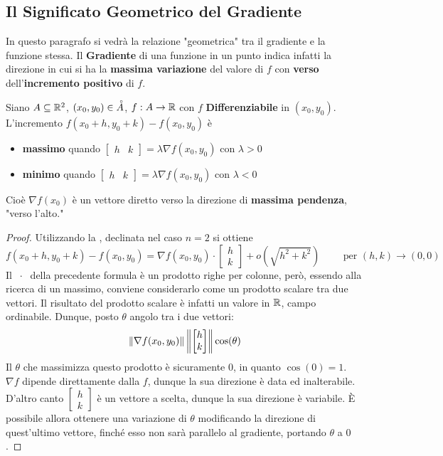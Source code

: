 \subsection{Il Significato Geometrico del Gradiente}
In questo paragrafo si vedrà la relazione "geometrica" tra il gradiente e la funzione stessa. Il \textbf{Gradiente} di una funzione in un punto indica infatti la direzione in cui si ha la \textbf{massima variazione} del valore di $f$ con \textbf{verso} dell'\textbf{incremento positivo} di $f$.
\begin{proposition}
	Siano $A \subseteq \mathbb{R}^2$, $(x_0, y_0) \in \accentset{\circ}{A}$, $f: A \to \mathbb{R}$ con $f$ \textbf{Differenziabile} in $(x_0, y_0)$.\\
	L'incremento $f(x_0 + h, y_0 + k) - f(x_0, y_0)$ è
	\begin{itemize}[noitemsep]
		\item \textbf{massimo} quando $\begin{bmatrix}h & k\end{bmatrix} = \lambda \nabla f(x_0, y_0)$ con $\lambda > 0$
		\item \textbf{minimo} quando $\begin{bmatrix}h & k\end{bmatrix} = \lambda \nabla f(x_0, y_0)$ con $\lambda < 0$
	\end{itemize}
	Cioè $\nabla f(x_0)$ è un vettore diretto verso la direzione di \textbf{massima pendenza}, "verso l'alto."
	\begin{proof}
		Utilizzando la , declinata nel caso $n = 2$ si ottiene
		\begin{equation}
			\label{eq:dim_dir_grad}
			f(x_0 + h, y_0 + k) -
			f(x_0, y_0) =
			\nabla f(x_0, y_0) \cdot
			\begin{bmatrix}
				h\\k
			\end{bmatrix} +
			o(\sqrt{h^2 + k^2})
			\qquad \text{ per } (h,k) \to (0,0)
		\end{equation}
		Il $\;\cdot\;$ della precedente formula è un prodotto righe per colonne, però, essendo alla ricerca di un massimo, conviene considerarlo come un prodotto scalare tra due vettori. Il risultato del prodotto scalare è infatti un valore in $\mathbb{R}$, campo ordinabile. Dunque, posto $\theta$ angolo tra i due vettori:
		\[\left\|\nabla f(x_0, y_0)\right\| \left\|\begin{bmatrix}h\\k\end{bmatrix}\right\| \cos(\theta)\]
		Il $\theta$ che massimizza questo prodotto è sicuramente $0$, in quanto $\cos(0) = 1$.\\
		$\nabla f$ dipende direttamente dalla $f$, dunque la sua direzione è data ed inalterabile. D'altro canto $\begin{bmatrix}h\\k\end{bmatrix}$ è un vettore a scelta, dunque la sua direzione è variabile. È possibile allora ottenere una variazione di $\theta$ modificando la direzione di quest'ultimo vettore, finché esso non sarà parallelo al gradiente, portando $\theta$ a $0$.


\end{proof}
\end{proposition}

